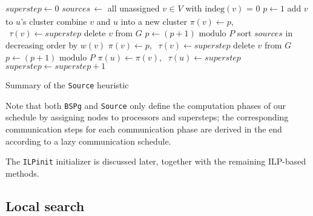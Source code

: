 \documentclass[sigconf,nonacm]{acmart}
\begin{document}
\begin{algorithm}[h!]
\begin{algorithmic}
    \STATE $superstep \leftarrow 0$
        \STATE $sources \, \leftarrow$ all unassigned $v _{\!} \in _{\!} V$ with $\text{indeg}(v) _{\!} = _{\!} 0$
         \STATE $p \leftarrow 1$
                        \STATE add $v$ to $u$'s cluster
                    \ELSE
                        \STATE combine $v$ and $u$ into a new cluster
                    \ENDIF
                \ENDIF
            \ENDFOR
                    \STATE $\pi(v) \leftarrow p$, $\: \: \tau(v) \leftarrow superstep$
                    \STATE delete $v$ from $G$
                \ENDFOR
                \STATE $p \leftarrow (p+1) \text{ modulo } P$
            \ENDFOR
        \ELSE
            \STATE sort $sources$ in decreasing order by $w(v)$
                \STATE $\pi(v) \leftarrow p$, $\: \: \tau(v) \leftarrow superstep$
                \STATE delete $v$ from $G$
                \STATE $p \leftarrow (p+1) \text{ modulo } P$
            \ENDFOR
        \ENDIF
                    \STATE $\pi(u) \leftarrow \pi(v)$, $\: \: \tau(u) \leftarrow superstep$
                \ENDIF
        \ENDFOR
        \STATE $superstep \leftarrow superstep+1$
    \ENDWHILE
    \caption{\textsf{Summary of the \texttt{Source} heuristic}}
    \label{alg:source2}
\end{algorithmic}
\end{algorithm}

Note that both \texttt{BSPg} and \texttt{Source} only define the computation phases of our schedule by assigning nodes to processors and supersteps; the corresponding communication steps for each communication phase are derived in the end according to a lazy communication schedule.

The \texttt{ILPinit} initializer is discussed later, together with the remaining ILP-based methods.

\subsection{Local search}
\end{document}
